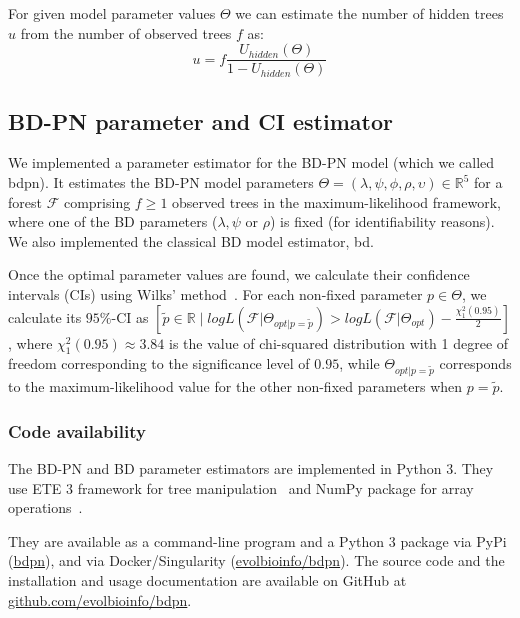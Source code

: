 \documentclass[10pt,letterpaper]{article}
\begin{document}
For given model parameter values $\Theta$ we can estimate the number of hidden trees $u$ from the number of observed trees $f$ as:
\begin{equation}
u = f \frac{U_{hidden}(\Theta)}{1 - U_{hidden}(\Theta)}\label{eq:u} 
\end{equation}


\subsection*{BD-PN parameter and CI estimator}\label{sec:sim}
We implemented a parameter estimator for the BD-PN model (which we called bdpn). It estimates the BD-PN model parameters  $\Theta = (\lambda,\psi,\phi,\rho,\upsilon) \in \mathbb{R}^5$ for a forest $\mathscr{F}$ comprising $f \geq 1$ observed trees in the maximum-likelihood framework, where one of the BD parameters ($\lambda,\psi$ or $\rho$) is fixed (for identifiability reasons). We also implemented the classical BD model estimator, bd.

Once the optimal parameter values are found, we calculate their confidence intervals (CIs) using Wilks' method~\cite{Wilks1938}.
For each non-fixed parameter $p \in \Theta$, we calculate its $95\%$-CI as $[\tilde{p} \in \mathbb{R}\; |\; log L(\mathscr{F}|\Theta_{opt|p=\tilde{p}}) > log L(\mathscr{F}| \Theta_{opt}) - \frac{\chi^2_1(0.95)}{2}]$, where $\chi^2_1(0.95) \approx 3.84$ is the value of chi-squared distribution with 1 degree of freedom corresponding to the significance level of $0.95$, while $\Theta_{opt|p=\tilde{p}}$ corresponds to the maximum-likelihood value for the other non-fixed parameters when $p = \tilde{p}$. 

\subsubsection*{Code availability}
The BD-PN and BD parameter estimators are implemented in Python 3. They use ETE 3 framework for tree manipulation~\cite{Huerta-Cepas2016} and NumPy package for array operations~\cite{harris_array_2020}. 

They are available as a command-line program and a Python 3 package via PyPi (\href{https://pypi.org/project/bdpn}{bdpn}), and via Docker/Singularity (\href{https://hub.docker.com/r/evolbioinfo/bdpn/tags}{evolbioinfo/bdpn}). The source code and the installation and usage documentation are available on GitHub at \href{https://github.com/evolbioinfo/bdpn}{github.com/evolbioinfo/bdpn}.
\end{document}
